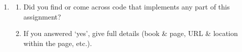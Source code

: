 \begin{enumerate}
    \item
    \begin{enumerate}
        \item Did you find or come across code that implements any part of this assignment?

        \item If you answered `yes', give full details (book \& page, URL \& location within the page, etc.).\\

        \begin{tcolorbox}[fit,height=4cm, width=15cm, blank, borderline={1pt}{-2pt},nobeforeafter]


        \end{tcolorbox}

    \end{enumerate}
\end{enumerate}
